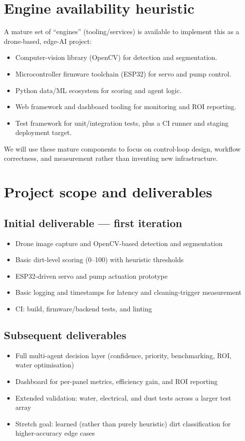 \documentclass[11pt]{article}
\begin{document}
\section{Engine availability heuristic}
A mature set of ``engines'' (tooling/services) is available to implement this as a drone-based, edge-AI project:
\begin{itemize}
    \item Computer-vision library (OpenCV) for detection and segmentation.
    \item Microcontroller firmware toolchain (ESP32) for servo and pump control.
    \item Python data/ML ecosystem for scoring and agent logic.
    \item Web framework and dashboard tooling for monitoring and ROI reporting.
    \item Test framework for unit/integration tests, plus a CI runner and staging deployment target.
\end{itemize}
We will use these mature components to focus on control-loop design, workflow correctness, and measurement rather than inventing new infrastructure.

\section{Project scope and deliverables}

\subsection{Initial deliverable --- first iteration}
\begin{itemize}
    \item Drone image capture and OpenCV-based detection and segmentation
    \item Basic dirt-level scoring (0--100) with heuristic thresholds
    \item ESP32-driven servo and pump actuation prototype
    \item Basic logging and timestamps for latency and cleaning-trigger measurement
    \item CI: build, firmware/backend tests, and linting
\end{itemize}

\subsection{Subsequent deliverables}
\begin{itemize}
    \item Full multi-agent decision layer (confidence, priority, benchmarking, ROI, water optimisation)
    \item Dashboard for per-panel metrics, efficiency gain, and ROI reporting
    \item Extended validation: water, electrical, and dust tests across a larger test array
    \item Stretch goal: learned (rather than purely heuristic) dirt classification for higher-accuracy edge cases
\end{itemize}
\end{document}
